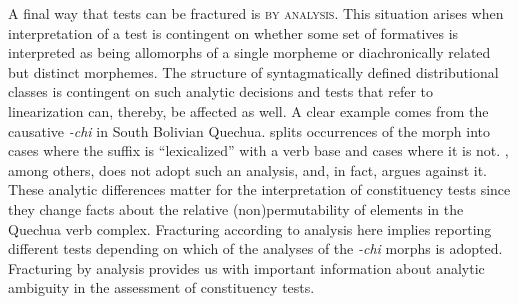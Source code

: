 \documentclass[output=paper,hidelinks]{langscibook}
\begin{document}
A final way that tests can be fractured is \textsc{by analysis}. This situation arises when interpretation of a test is contingent on whether some set of formatives is interpreted as being allomorphs of a single morpheme or diachronically related but distinct morphemes. The structure of syntagmatically defined distributional classes is contingent on such analytic decisions and tests that refer to linearization can, thereby, be affected as well. A clear example comes from the causative \textit{-chi} in South Bolivian Quechua. \citet{camachorios2022verbal} splits occurrences of the morph into cases where the suffix is ``lexicalized'' with a verb base and cases where it is not. \citet{muysken:1981}, among others, does  not adopt such an analysis, and, in fact, argues against it. These analytic differences matter for the interpretation of constituency tests since they change facts about the relative (non)permutability of elements in the Quechua verb complex. Fracturing according to analysis here implies reporting different tests depending on which of the analyses of the \textit{-chi} morphs is adopted. Fracturing by analysis provides us with important information about analytic ambiguity in the assessment of constituency tests.







\end{document}
